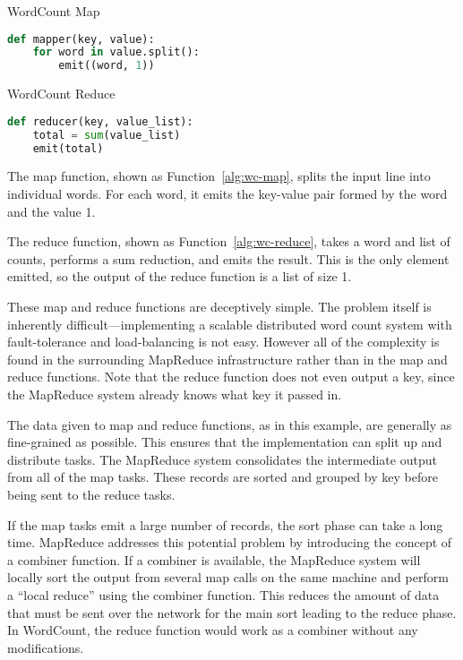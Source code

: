 \documentclass[letterpaper]{sig-alternate}
\begin{document}
\begin{algorithm}[tbp]
\caption{WordCount Map}
\label{alg:wc-map}
\begin{lstlisting}[language=Python]
def mapper(key, value):
    for word in value.split():
        emit((word, 1))
\end{lstlisting}
\end{algorithm}

\begin{algorithm}[tbp]
\caption{WordCount Reduce}
\label{alg:wc-reduce}
\begin{lstlisting}[language=Python]
def reducer(key, value_list):
    total = sum(value_list)
    emit(total)
\end{lstlisting}
\end{algorithm}

The map function, shown as Function~\ref{alg:wc-map}, splits the input line
into individual words.  For each word, it emits the key-value pair formed by
the word and the value 1.

The reduce function, shown as Function~\ref{alg:wc-reduce}, takes a word and
list of counts, performs a sum reduction, and emits the result.  This is the
only element emitted, so the output of the reduce function is a list of size
1.

These map and reduce functions are deceptively simple.  The problem itself is
inherently difficult---implementing a scalable distributed word count system
with fault-tolerance and load-balancing is not easy.  However all of the
complexity is found in the surrounding MapReduce infrastructure rather than in
the map and reduce functions.  Note that the reduce function does not even
output a key, since the MapReduce system already knows what key it passed in.

The data given to map and reduce functions, as in this example, are generally
as fine-grained as possible.  This ensures that the implementation can split
up and distribute tasks.  The MapReduce system consolidates the intermediate
output from all of the map tasks.  These records are sorted and grouped by
key before being sent to the reduce tasks.

If the map tasks emit a large number of records, the sort phase can take a
long time.  MapReduce addresses this potential problem by introducing the
concept of a combiner function.  If a combiner is available, the MapReduce
system will locally sort the output from several map calls on the same machine
and perform a ``local reduce'' using the combiner function.  This reduces the
amount of data that must be sent over the network for the main sort leading to
the reduce phase. In WordCount, the reduce function would work as a combiner
without any modifications.
\end{document}
